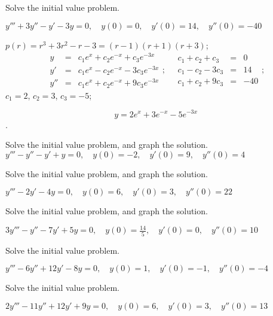 \documentclass{ximera}
\begin{document}
\begin{problem}\label{exer:9.2.16}  Solve the
initial value problem.

$y'''+3y''-y'-3y=0, \quad  y(0)=0,\quad y'(0)=14,\quad y''(0)=-40$

\begin{solution}
$p(r)=r^3+3r^2-r-3=(r-1)(r+1)(r+3)$;
$$
\begin{array}{lcl}
y&=&c_1e^x+c_2e^{-x}+c_3e^{-3x}\\
y'&=&c_1e^x-c_2e^{-x}-3c_3e^{-3x}\\
y''&=&c_1e^x+c_2e^{-x}+9c_3e^{-3x}
\end{array};\quad
\begin{array}{rcr}
c_1+c_2+c_3&=&0\\
c_1-c_2-3c_3&=&14\\
c_1+c_2+9c_3&=&-40
\end{array};
$$
$c_1=2$, $c_2=3$, $c_3=-5$;

 $$y=2e^x+3e^{-x}-5e^{-3x}$$.
\end{solution}
\end{problem}

\begin{problem}\label{exer:9.2.17} Solve the
initial value problem, and graph the solution.
$y'''-y''-y'+y=0, \quad  y(0)=-2,\quad y'(0)=9,\quad y''(0)=4$
\end{problem}

\begin{problem}\label{exer:9.2.18} Solve the
initial value problem, and graph the solution.

$y'''-2y'-4y=0, \quad  y(0)=6,\quad y'(0)=3,\quad y''(0)=22$
\end{problem}

\begin{problem}\label{exer:9.2.19} Solve the
initial value problem, and graph the solution.

$3y'''-y''-7y'+5y=0, \quad  y(0)=\frac{14}{5},\quad y'(0)=0,\quad y''(0)=10$
\end{problem}

\begin{problem}\label{exer:9.2.20}  Solve the
initial value problem.

$y'''-6y''+12y'-8y=0, \quad  y(0)=1,\quad y'(0)=-1,\quad y''(0)=-4$
\end{problem}

\begin{problem}\label{exer:9.2.21}  Solve the
initial value problem.

$2y'''-11y''+12y'+9y=0, \quad  y(0)=6,\quad y'(0)=3,\quad y''(0)=13$
\end{problem}
\end{document}
